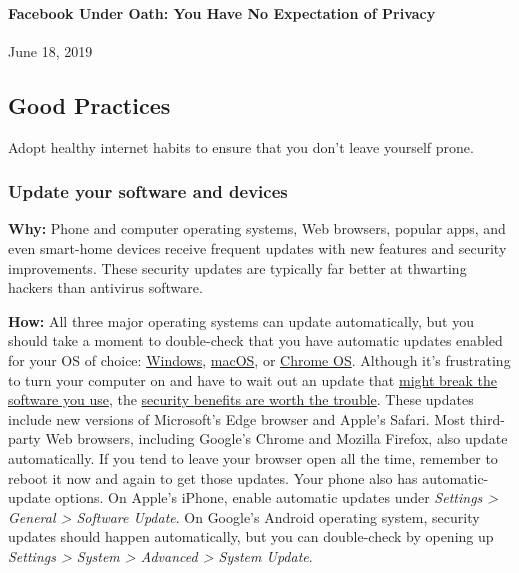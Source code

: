 \hypertarget{facebook-under-oath-you-have-no-expectation-of-privacy}{%
\paragraph{Facebook Under Oath: You Have No Expectation of
Privacy}\label{facebook-under-oath-you-have-no-expectation-of-privacy}}

June 18, 2019

\hypertarget{good-practices}{%
\subsection{Good Practices}\label{good-practices}}

Adopt healthy internet habits to ensure that you don't leave yourself
prone.~

\hypertarget{update-your-software-and-devices}{%
\subsubsection{Update your software and
devices}\label{update-your-software-and-devices}}

\textbf{Why:} Phone and computer operating systems, Web browsers,
popular apps, and even smart-home devices receive frequent updates with
new features and security improvements. These security updates are
typically far better at thwarting hackers than antivirus software.

\textbf{How:} All three major operating systems can update
automatically, but you should take a moment to double-check that you
have automatic updates enabled for your OS of choice:
\href{https://support.microsoft.com/en-us/help/12373/windows-update-faq}{Windows},
\href{https://support.apple.com/guide/mac-help/get-macos-updates-mchlpx1065/mac}{macOS},
or
\href{https://support.google.com/chrome/a/answer/3168106?hl=en}{Chrome
OS}. Although it's frustrating to turn your computer on and have to wait
out an update that
\href{https://www.nytimes3xbfgragh.onion/2017/02/24/technology/personaltech/automatic-update-headaches.html}{might
break the software you use}, the
\href{https://www.nytimes3xbfgragh.onion/2019/03/27/opinion/asus-malware-hack.html}{security
benefits are worth the trouble}. These updates include new versions of
Microsoft's Edge browser and Apple's Safari. Most third-party Web
browsers, including Google's Chrome and Mozilla Firefox, also update
automatically. If you tend to leave your browser open all the time,
remember to reboot it now and again to get those updates. Your phone
also has automatic-update options. On Apple's iPhone, enable automatic
updates under \emph{Settings \textgreater{} General \textgreater{}
Software Update}. On Google's Android operating system, security updates
should happen automatically, but you can double-check by opening up
\emph{Settings \textgreater{} System \textgreater{} Advanced
\textgreater{} System Update}.

